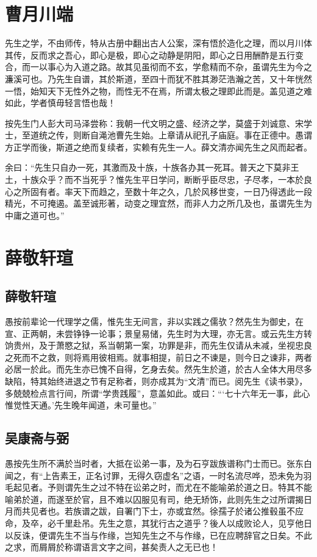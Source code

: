 \documentclass[
    title = 中文标题,
    author = 香饽饽,
    affiliation = 复旦大学,
    column = twocolumn,
    ref = refDemo.bib,
    lang = cn
]{spArticle}
\begin{document}
    \section{曹月川端}
    先生之学，不由师传，特从古册中翻出古人公案，深有悟於造化之理，而以月川体其传，反而求之吾心，即心是极，即心之动静是阴阳，即心之日用酬酢是五行变合，而一以事心为入道之路。故其见虽彻而不玄，学愈精而不杂，虽谓先生为今之濂溪可也。乃先生自谱，其於斯道，至四十而犹不胜其渺茫浩瀚之苦，又十年恍然一悟，始知天下无性外之物，而性无不在焉，所谓太极之理即此而是。盖见道之难如此，学者慎毋轻言悟也哉！

    按先生门人彭大司马泽尝称：我朝一代文明之盛、经济之学，莫盛于刘诚意、宋学士，至道统之传，则断自渑池曹先生始。上章请从祀孔子庙庭。事在正德中。愚谓方正学而後，斯道之绝而复续者，实赖有先生一人。薛文清亦闻先生之风而起者。

    余曰：“先生只自办一死，其激而及十族，十族各办其一死耳。普天之下莫非王土，十族众乎？而不当死乎？惟先生平日学问，断断乎臣尽忠，子尽孝，一本於良心之所固有者。率天下而趋之，至数十年之久，几於风移世变，一日乃得透此一段精光，不可掩遏。盖至诚形著，动变之理宜然，而非人力之所几及也，虽谓先生为中庸之道可也。”

    \section{薛敬轩瑄}
        \subsection{薛敬轩瑄}
            愚按前辈论一代理学之儒，惟先生无间言，非以实践之儒欤？然先生为御史，在宣、正两朝，未尝铮铮一论事；景皇易储，先生时为大理，亦无言。或云先生方转饷贵州，及于萧愍之狱，系当朝第一案，功罪是非，而先生仅请从未减，坐视忠良之死而不之救，则将焉用彼相焉。就事相提，前日之不谏是，则今日之谏非，两者必居一於此。而先生亦已愧不自得，乞身去矣。然先生於道，於古人全体大用尽多缺陷，特其始终进退之节有足称者，则亦成其为“文清”而已。阅先生《读书录》，多兢兢检点言行间，所谓“学贵践履”，意盖如此。或曰：“‘七十六年无一事，此心惟觉性天通。’先生晚年闻道，未可量也。”

        \subsection{吴康斋与弼}
            愚按先生所不满於当时者，大抵在讼弟一事，及为石亨跋族谱称门士而已。张东白闻之，有“上告素王，正名讨罪，无得久窃虚名”之语，一时名流尽哗，恐未免为羽毛起见者。予则谓先生之过不特在讼弟之时，而尤在不能喻弟於道之日。特其不能喻弟於道，而遂至於官，且不难以囚服见有司，绝无矫饰，此则先生之过所谓揭日月而共见者也。若族谱之跋，自署门下士，亦或宜然。徐孺子於诸公推毂虽不应命，及卒，必千里赴吊。先生之意，其犹行古之道乎？後人以成败论人，见亨他日以反诛，便谓先生不当与作缘，岂知先生之不与作缘，已在应聘辞官之日矣。不此之求，而屑屑於称谓语言文字之间，甚矣责人之无已也！
\end{document}
